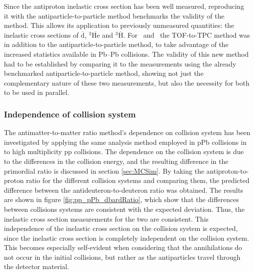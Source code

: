Since the antiproton inelastic cross section has been well measured, reproducing it with the antiparticle-to-particle method benchmarks the validity of the method. This allows its application to previously unmeasured quantities: the inelastic cross sections of $\overline{\mathrm{d}}$, $^3\overline{\mathrm{He}}$ and $^3\overline{\mathrm{H}}$. For \ahe\ and \atrit\ the TOF-to-TPC method was in addition to the antiparticle-to-particle method, to take advantage of the increased statistics available in Pb--Pb collisions. The validity of this new method had to be established by comparing it to the measurements using the already benchmarked antiparticle-to-particle method, showing not just the complementary nature of these two measurements, but also the necessity for both to be used in parallel.
\subsubsection{Independence of collision system}
The antimatter-to-matter ratio method's dependence on collision system has been investigated by applying the same analysis method employed in pPb collisions in \cite{antideuteronXS} to high multiplicity pp collisions. The dependence on the collision system is due to the differences in the collision energy, and the resulting difference in the primordial ratio is discussed in section \ref{sec:MCSim}. By taking the antiproton-to-proton ratio for the different collision systems and comparing them, the predicted difference between the antideuteron-to-deuteron ratio was obtained. The results are shown in figure \ref{fig:pp_pPb_dbardRatio}, which show that the differences between collisions systems are consistent with the expected deviation. Thus, the inelastic cross section measurements for the two are consistent. This independence of the inelastic cross section on the collision system is expected, since the inelastic cross section is completely independent on the collision system. This becomes especially self-evident when considering that the annihilations do not occur in the initial collisions, but rather as the antiparticles travel through the detector material.

